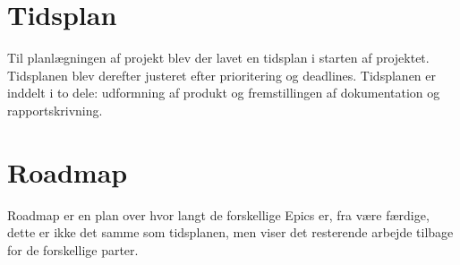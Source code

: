 \section{Tidsplan}

Til planlægningen af projekt blev der lavet en tidsplan i starten af projektet. Tidsplanen blev derefter justeret efter prioritering og deadlines. Tidsplanen er inddelt i to dele: udformning af produkt og fremstillingen af dokumentation og rapportskrivning.


\section{Roadmap}

Roadmap er en plan over hvor langt de forskellige Epics er, fra være færdige, dette er ikke det samme som tidsplanen, men viser det resterende arbejde tilbage for de forskellige parter.

